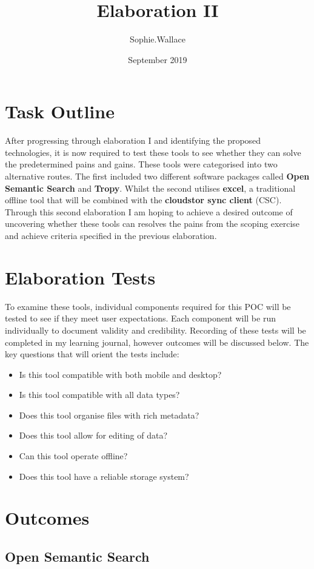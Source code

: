 \documentclass{article}
\title{Elaboration II}
\author{Sophie.Wallace }
\date{September 2019}
\begin{document}
\maketitle

\section{Task Outline}
After progressing through elaboration I and identifying the proposed technologies, it is now required to test these tools to see whether they can solve the predetermined pains and gains. These tools were categorised into two alternative routes. The first included two different software packages called \textbf{Open Semantic Search} and \textbf{Tropy}. Whilst the second utilises \textbf{excel}, a traditional offline tool that will be combined with the \textbf{cloudstor sync client} (CSC). Through this second elaboration I am hoping to achieve a desired outcome of uncovering whether these tools can resolves the pains from the scoping exercise and achieve criteria specified in the previous elaboration.


\section{Elaboration Tests}
To examine these tools, individual components required for this POC will be tested to see if they meet user expectations. Each component will be run individually to document validity and credibility. Recording of these tests will be completed in my learning journal, however outcomes will be discussed below. The key questions that will orient the tests include:
\begin{itemize}
\item Is this tool compatible with both mobile and desktop?
\item Is this tool compatible with all data types?
\item Does this tool organise files with rich metadata?
\item Does this tool allow for editing of data?
\item Can this tool operate offline?
\item Does this tool have a reliable storage system?
\end{itemize}

\section{Outcomes}
\subsection{Open Semantic Search}
\end{document}
